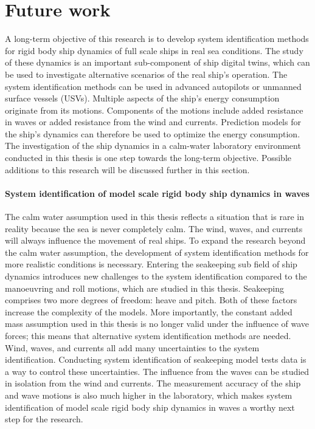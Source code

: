 \chapter{Future work\label{ch:future_work}}
A long-term objective of this research is to develop system identification methods for rigid body ship dynamics of full scale ships in real sea conditions. The study of these dynamics is an important sub-component of ship digital twins, which can be used to investigate alternative scenarios of the real ship's operation. The system identification methods can be used in advanced autopilots or unmanned surface vessels (USVs). Multiple aspects of the ship's energy consumption originate from its motions. Components of the motions include added resistance in waves or added resistance from the wind and currents. Prediction models for the ship's dynamics can therefore be used to optimize the energy consumption. The investigation of the ship dynamics in a calm-water laboratory environment conducted in this thesis is one step towards the long-term objective. Possible additions to this research will be discussed further in this section.  

\subsubsection*{\normalfont \color{black} \textbf{System identification of model scale rigid body ship dynamics in waves}}
The calm water assumption used in this thesis reflects a situation that is rare in reality because the sea is never completely calm. The wind, waves, and currents will always influence the movement of real ships. To expand the research beyond the calm water assumption, the development of system identification methods for more realistic conditions is necessary. Entering the seakeeping sub field of ship dynamics introduces new challenges to the system identification compared to the manoeuvring and roll motions, which are studied in this thesis. Seakeeping comprises two more degrees of freedom: heave and pitch. Both of these factors increase the complexity of the models. More importantly, the constant added mass assumption used in this thesis is no longer valid under the influence of wave forces; this means that alternative system identification methods are needed. Wind, waves, and currents all add many uncertainties to the system identification. Conducting system identification of seakeeping model tests data is a way to control these uncertainties. The influence from the waves can be studied in isolation from the wind and currents. The measurement accuracy of the ship and wave motions is also much higher in the laboratory, which makes system identification of model scale rigid body ship dynamics in waves a worthy next step for the research.  

